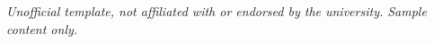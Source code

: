 \documentclass[twoside]{mitthesis}%
\begin{document}


%
%
%


%
%
%
%
%
%
%
%
%

%
%


\maketitle
\thispagestyle{empty}\begin{center}{\footnotesize\itshape Unofficial template, not affiliated with or endorsed by the university. Sample content only.\par}\end{center}


%  
\end{document}
